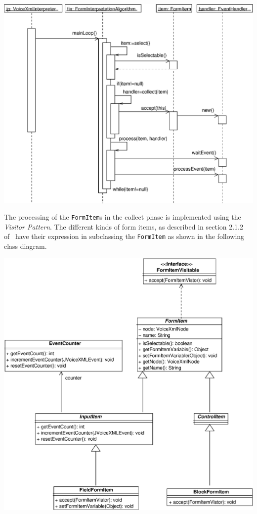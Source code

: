 \documentclass[11pt,a4paper]{article}
\begin{document}
\begin{center}
\includegraphics[scale=0.6]{seq-interpreter-fia-mainloop.eps}
\end{center}

The processing of the \texttt{FormItem}s in the collect phase
is implemented using the \emph{Visitor Pattern}.
The different kinds of form items, as described in section 2.1.2 
of~\cite{w3.org:voicexml} have their expression in subclassing the
\texttt{FormItem} as shown in the following class diagram.

\begin{center}
\includegraphics[scale=0.5]{class-interpreter-formitem.eps}
\end{center}
\end{document}
